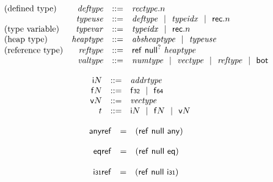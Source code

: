 $$
\begin{array}[t]{@{}lrrl@{}l@{}}
\mbox{(defined type)} & {\mathit{deftype}} & ::= & {\mathit{rectype}} {.} n \\
& {\mathit{typeuse}} & ::= & {\mathit{deftype}} ~~|~~ {\mathit{typeidx}} ~~|~~ \mathsf{rec} {.} n \\
\mbox{(type variable)} & {\mathit{typevar}} & ::= & {\mathit{typeidx}} ~~|~~ \mathsf{rec} {.} n \\
\mbox{(heap type)} & {\mathit{heaptype}} & ::= & {\mathit{absheaptype}} ~~|~~ {\mathit{typeuse}} \\
\mbox{(reference type)} & {\mathit{reftype}} & ::= & \mathsf{ref}~{\mathsf{null}^?}~{\mathit{heaptype}} \\
& {\mathit{valtype}} & ::= & {\mathit{numtype}} ~~|~~ {\mathit{vectype}} ~~|~~ {\mathit{reftype}} ~~|~~ \mathsf{bot} \\
\end{array}
$$

\vspace{1ex}

$$
\begin{array}[t]{@{}lrrl@{}l@{}}
& {\mathsf{i}}{N} & ::= & {\mathit{addrtype}} \\
& {\mathsf{f}}{N} & ::= & \mathsf{f{\scriptstyle 32}} ~~|~~ \mathsf{f{\scriptstyle 64}} \\
& {\mathsf{v}}{N} & ::= & {\mathit{vectype}} \\
& t & ::= & {\mathsf{i}}{N} ~~|~~ {\mathsf{f}}{N} ~~|~~ {\mathsf{v}}{N} \\
\end{array}
$$

\vspace{1ex}

$$
\begin{array}[t]{@{}lcl@{}l@{}}
\mathsf{anyref} & = & (\mathsf{ref}~\mathsf{null}~\mathsf{any}) \\
\end{array}
$$

$$
\begin{array}[t]{@{}lcl@{}l@{}}
\mathsf{eqref} & = & (\mathsf{ref}~\mathsf{null}~\mathsf{eq}) \\
\end{array}
$$

$$
\begin{array}[t]{@{}lcl@{}l@{}}
\mathsf{i{\scriptstyle 31}ref} & = & (\mathsf{ref}~\mathsf{null}~\mathsf{i{\scriptstyle 31}}) \\
\end{array}
$$

